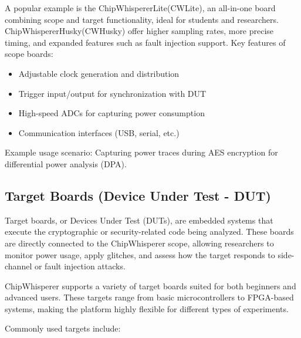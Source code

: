 A popular example is the ChipWhispererLite(CWLite), an all-in-one board combining scope and target functionality, ideal for students and researchers. ChipWhispererHusky(CWHusky) offer higher sampling rates, more precise timing, and expanded features such as fault injection support.
Key features of scope boards:
\begin{itemize}
    \item Adjustable clock generation and distribution
    \item Trigger input/output for synchronization with DUT
    \item High-speed ADCs for capturing power consumption
    \item Communication interfaces (USB, serial, etc.)
\end{itemize}
Example usage scenario: Capturing power traces during AES encryption for differential power analysis (DPA).
\subsection{Target Boards (Device Under Test - DUT)}

Target boards, or Devices Under Test (DUTs), are embedded systems that execute the cryptographic or security-related code being analyzed. These boards are directly connected to the ChipWhisperer scope, allowing researchers to monitor power usage, apply glitches, and assess how the target responds to side-channel or fault injection attacks.

ChipWhisperer supports a variety of target boards suited for both beginners and advanced users. These targets range from basic microcontrollers to FPGA-based systems, making the platform highly flexible for different types of experiments.

Commonly used targets include:

